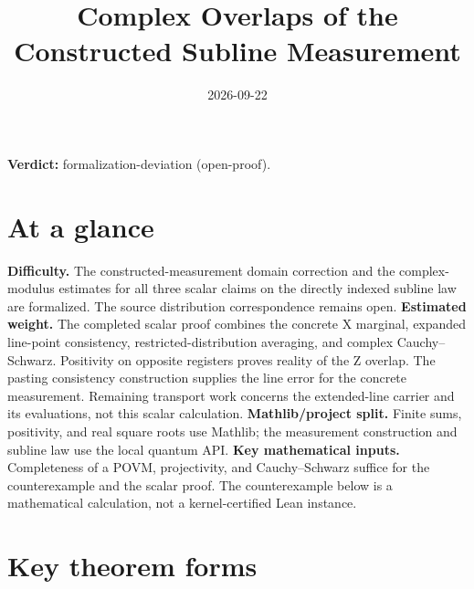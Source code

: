 \documentclass[11pt]{article}
\title{Complex Overlaps of the Constructed Subline Measurement}
\author{}
\date{2026-09-22}
\providecommand{\gapnote}[2]{\par\noindent\textbf{Verdict:} #1 (#2).\par}
\begin{document}
\maketitle
\gapnote{formalization-deviation}{open-proof}

\section{At a glance}

\textbf{Difficulty.} The constructed-measurement domain correction and the
complex-modulus estimates for all three scalar claims on the directly indexed
subline law are formalized. The source distribution correspondence remains open.
\textbf{Estimated weight.} The completed scalar proof combines the concrete
X marginal, expanded line-point consistency, restricted-distribution
averaging, and complex Cauchy--Schwarz. Positivity on opposite registers proves
reality of the Z overlap. The pasting consistency construction supplies the
line error for the concrete measurement. Remaining transport work concerns
the extended-line carrier and its evaluations, not this scalar calculation.
\textbf{Mathlib/project split.} Finite sums, positivity, and real
square roots use Mathlib; the measurement construction and subline law use
the local quantum API. \textbf{Key mathematical inputs.} Completeness of a
POVM, projectivity, and Cauchy--Schwarz suffice for the counterexample and
the scalar proof. The counterexample below is a mathematical
calculation, not a kernel-certified Lean instance.

\section{Key theorem forms}
\end{document}
